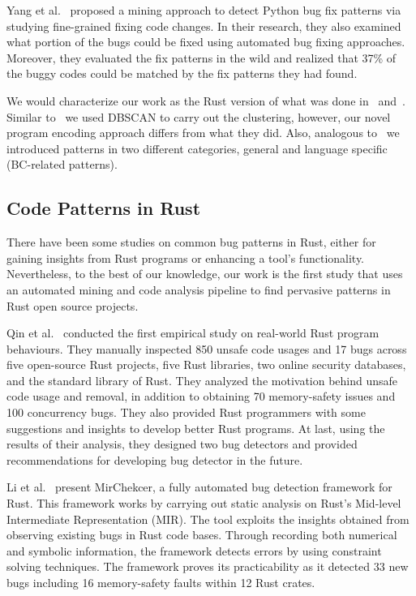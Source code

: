 Yang et al.~\cite{yang2022mining} proposed a mining approach to detect Python bug fix patterns via studying fine-grained fixing code changes. In their research, they also examined what portion of the bugs could be fixed using automated bug fixing approaches. Moreover, they evaluated the fix patterns in the wild and realized that 37\% of the buggy codes could be matched by the fix patterns they had found. 

We would characterize our work as the Rust version of what was done in~\cite{hanam2016discovering} and~\cite{yang2022mining}. Similar to~\cite{hanam2016discovering} we used DBSCAN to carry out the clustering, however, our novel program encoding approach differs from what they did. Also, analogous to~\cite{yang2022mining} we introduced patterns in two different categories, general and language specific (BC-related patterns).

\subsection{Code Patterns in Rust}

There have been some studies on common bug patterns in Rust, either for gaining insights from Rust programs or enhancing a tool's functionality. Nevertheless, to the best of our knowledge, our work is the first study that uses an automated mining and code analysis pipeline to find pervasive patterns in Rust open source projects.

Qin et al.~\cite{qin2020understanding} conducted the first empirical study on real-world Rust program behaviours. They manually inspected 850 unsafe code usages and 17 bugs across five open-source Rust projects, five Rust libraries, two online security databases, and the standard library of Rust. They analyzed the motivation behind unsafe code usage and removal, in addition to obtaining 70 memory-safety issues and 100 concurrency bugs. They also provided Rust programmers with some suggestions and insights to develop better Rust programs. At last, using the results of their analysis, they designed two bug detectors and provided recommendations for developing bug detector in the future.

Li et al.~\cite{li2021mirchecker} present MirChekcer, a fully automated bug detection framework for Rust. This framework works by carrying out static analysis on Rust's Mid-level Intermediate Representation (MIR). The tool exploits the insights obtained from observing existing bugs in Rust code bases. Through recording both numerical and symbolic information, the framework detects errors by using constraint solving techniques. The framework proves its practicability as it detected 33 new bugs including 16 memory-safety faults within 12 Rust crates.


